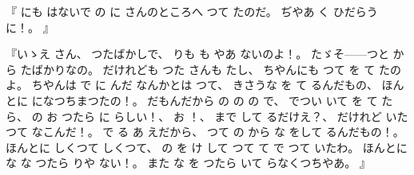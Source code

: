
『
にも
はないで
の
に
さんのところへ
つて
たのだ。
%
ぢやあ
く
ひだらうに！。
』

『いゝえ
さん、
%
つたばかしで、
%
りも
も
やあ
ないのよ！。
%
たゞそ{---}{---}つと
から
たばかりなの。
%
だけれども
つた
さんも
たし、
%
ちやんにも
つて
を
て
たのよ。
%
ちやんは
で
に
んだ
なんかとは
つて、
%
きさうな
を
て
るんだもの、
%
ほんとに
になつちまつたの！。%
%
だもんだから
の
の
の
で、
%
でつい
いて
を
て
たら、
%
の
お
つたら
に
らしい！、
%
お
！、
%
まで
して
るだけえ？、
%
だけれど
いたつて
なこんだ！。
%
で
る
あ
えだから、
%
つて
の
から
な
をして
るんだもの！。
%
ほんとに
しくつて
しくつて、
%
の
を
け
して
つて
て
で
つて
いたわ。
%
ほんとに
な
な
つたら
りや
ない！。
%
また
な
を
つたら
いて
らなくつちやあ。
』

